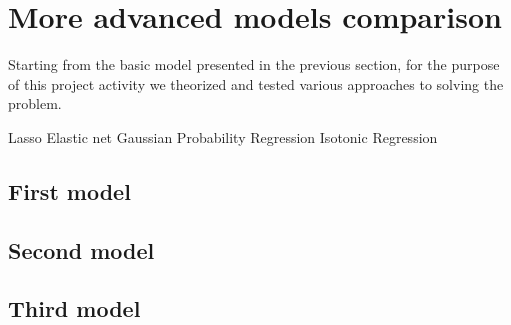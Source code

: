 \chapter{More advanced models comparison}
\label{capitolo3}
\thispagestyle{empty}

\noindent Starting from the basic model presented in the previous section, for the purpose of this project activity we theorized and tested various approaches to solving the problem.

Lasso
Elastic net
Gaussian Probability Regression
Isotonic Regression

\section{First model}


\section{Second model}


\section{Third model}

